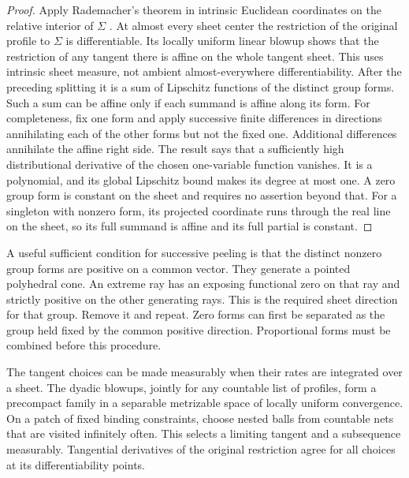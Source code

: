 \begin{proof}
Apply Rademacher's theorem in intrinsic Euclidean coordinates on
the relative interior of $\Sigma$
\cite[Theorem~3.1]{Heinonen2005Lipschitz}.  At almost every sheet center
the restriction of the original profile to $\Sigma$ is differentiable.
Its locally uniform linear blowup shows that the restriction of any
tangent there is affine on the whole tangent sheet.  This uses
intrinsic sheet measure, not ambient almost-everywhere differentiability.
After the preceding splitting it is a sum of Lipschitz functions
of the distinct group forms.  Such a sum can be affine only if
each summand is affine along its form.  For completeness, fix
one form and apply successive finite differences in directions
annihilating each of the other forms but not the fixed one.
Additional differences annihilate the affine right side.  The
result says that a sufficiently high distributional derivative
of the chosen one-variable function vanishes.  It is a
polynomial, and its global Lipschitz bound makes its degree at
most one.  A zero group form is constant on the sheet and
requires no assertion beyond that.  For a singleton with
nonzero form, its projected coordinate runs through the real
line on the sheet, so its full summand is affine and its full
partial is constant.
\end{proof}

\begin{remark}\label{ent:peeling-forms}
A useful sufficient condition for successive peeling is that the
distinct nonzero group forms are positive on a common vector.
They generate a pointed polyhedral cone.  An extreme ray has an
exposing functional zero on that ray and strictly positive on
the other generating rays.  This is the required sheet
direction for that group.  Remove it and repeat.  Zero forms
can first be separated as the group held fixed by the common
positive direction.  Proportional forms must be combined
before this procedure.

The tangent choices can be made measurably when their rates are
integrated over a sheet.  The dyadic blowups, jointly for any
countable list of profiles, form a precompact family in a
separable metrizable space of locally uniform convergence.
On a patch of fixed binding constraints, choose nested balls
from countable nets that are visited infinitely often.  This
selects a limiting tangent and a subsequence measurably.
Tangential derivatives of the original restriction agree for
all choices at its differentiability points.
\end{remark}

